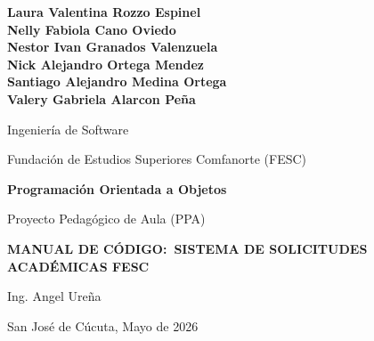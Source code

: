\documentclass[12pt,letterpaper]{article}
\begin{document}
\begin{titlepage}
    \centering
    \vspace*{0.5in}

    {\normalsize\bfseries
    Laura Valentina Rozzo Espinel\\
    Nelly Fabiola Cano Oviedo\\
    Nestor Ivan Granados Valenzuela\\
    Nick Alejandro Ortega Mendez\\
    Santiago Alejandro Medina Ortega\\
    Valery Gabriela Alarcon Peña
    \par}
    \vspace{0.6in}

    {\normalsize Ingeniería de Software \par}
    \vspace{0.4in}

    {\normalsize Fundación de Estudios Superiores Comfanorte (FESC) \par}
    \vspace{0.6in}

    {\normalsize\bfseries Programación Orientada a Objetos \par}
    \vspace{0.4in}

    {\normalsize Proyecto Pedagógico de Aula (PPA) \par}
    \vspace{0.5in}
    {\normalsize\bfseries MANUAL DE CÓDIGO:\ SISTEMA DE SOLICITUDES ACADÉMICAS FESC\par}
    \vspace{0.6in}

    {\normalsize Ing. Angel Ureña \par}

    \vfill
    {\normalsize San José de Cúcuta, Mayo de 2026 \par}
\end{titlepage}

\newpage
\tableofcontents

\newpage
{}
\listoftables
\end{document}
